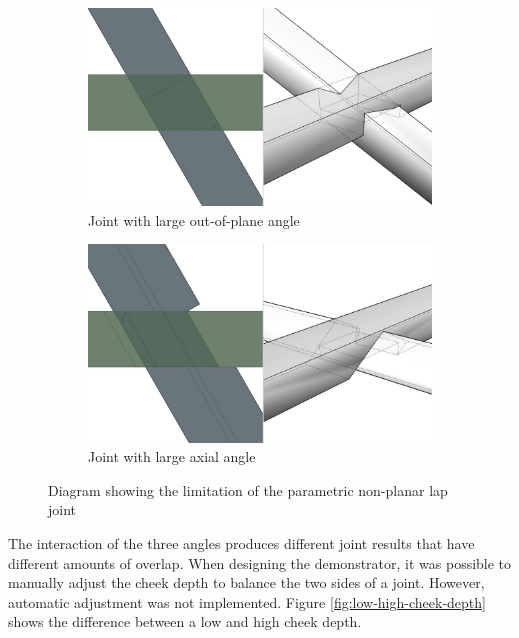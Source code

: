\begin{figure}[!h]
    \centering
    \begin{subfigure}[b]{0.49\textwidth}
        \centering
        \includegraphics[width=\textwidth]{images/7a/img21.jpg}
        \caption{Joint with large out-of-plane angle}
        \label{fig:large-out-of-plane-angle}
    \end{subfigure}
    \hfill
    \begin{subfigure}[b]{0.49\textwidth}
        \centering
        \includegraphics[width=\textwidth]{images/7a/img22.jpg}
        \caption{Joint with large axial angle}
        \label{fig:large-axial-angle}
    \end{subfigure}
    \caption{Diagram showing the limitation of the parametric non-planar lap joint}
    \label{fig:limitation-parametric-non-planar-lap-joint}
\end{figure}

The interaction of the three angles produces different joint results that have different amounts of overlap. When designing the demonstrator, it was possible to manually adjust the cheek depth to balance the two sides of a joint. However, automatic adjustment was not implemented. Figure \ref{fig:low-high-cheek-depth} shows the difference between a low and high cheek depth. 

